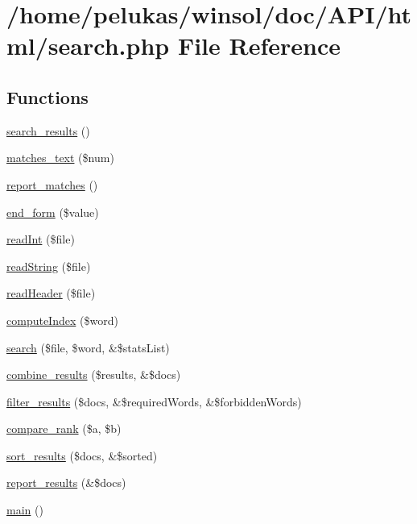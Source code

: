 \hypertarget{search_8php}{
\section{/home/pelukas/winsol/doc/API/html/search.php File Reference}
\label{search_8php}
}
\subsection*{Functions}
\begin{CompactItemize}
\item 
\hyperlink{search_8php_1e95c795bf9ffddb2afc947cd537d8e5}{search\_\-results} ()
\item 
\hyperlink{search_8php_8e29983d33c26f48eaa33c9fc1fea1f6}{matches\_\-text} (\$num)
\item 
\hyperlink{search_8php_c454a359a66d494b497d195ee5ddedea}{report\_\-matches} ()
\item 
\hyperlink{search_8php_095f793952db25774afee6ac14282837}{end\_\-form} (\$value)
\item 
\hyperlink{search_8php_a27cf6d8c68d6ccde28ac7e073d23d13}{read\-Int} (\$file)
\item 
\hyperlink{search_8php_c66aa84aaa7248d0fa8e4144824c7786}{read\-String} (\$file)
\item 
\hyperlink{search_8php_6f8f64c88f050e09fee6995bab140a66}{read\-Header} (\$file)
\item 
\hyperlink{search_8php_f1d20765fec546c31873b0e76c4761f3}{compute\-Index} (\$word)
\item 
\hyperlink{search_8php_f66786bda8b625ad1ea9c3e8adf0862f}{search} (\$file, \$word, \&\$stats\-List)
\item 
\hyperlink{search_8php_cc8965d7253948aba9889870fee87924}{combine\_\-results} (\$results, \&\$docs)
\item 
\hyperlink{search_8php_a3ad63db949fe271191c2bce3be45b1b}{filter\_\-results} (\$docs, \&\$required\-Words, \&\$forbidden\-Words)
\item 
\hyperlink{search_8php_0532bbe33ac8a423a76189fa6ba3dd98}{compare\_\-rank} (\$a, \$b)
\item 
\hyperlink{search_8php_4d779e04b0b0d65648e829919359fdf8}{sort\_\-results} (\$docs, \&\$sorted)
\item 
\hyperlink{search_8php_4dc0f1a0569e69ffa8ed5b292d72f0e9}{report\_\-results} (\&\$docs)
\item 
\hyperlink{search_8php_51af30a60f9f02777c6396b8247e356f}{main} ()
\end{CompactItemize}


